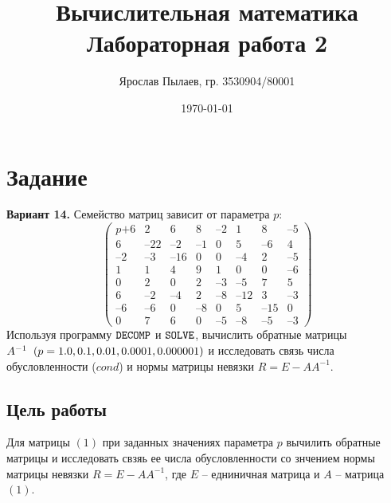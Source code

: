 \documentclass[a4paper,11pt]{article}
\title{Вычислительная математика \\ Лабораторная работа 2}
\author{Ярослав Пылаев, гр. 3530904/80001}
\date{\today}
\begin{document}
\maketitle
\newpage

\section{Задание}
\noindent \textbf{Вариант 14.} Семейство матриц зависит от параметра $p$:
\begin{equation}
  \begin{pmatrix}
    p\text{+}6 & 2 & 6 & 8 & \text{--}2 & 1 & 8 & \text{--}5 \\
    6 & \text{--}22 & \text{--}2 & \text{--}1 & 0 & 5 & \text{--}6 & 4 \\
    \text{--}2 & \text{--}3 & \text{--}16 & 0 & 0 & \text{--}4 & 2 & \text{--}5 \\
    1 & 1 & 4 & 9 & 1 & 0 & 0 & \text{--}6 \\
    0 & 2 & 0 & 2 & \text{--}3 & \text{--}5 & 7 & 5 \\
    6 & \text{--}2 & \text{--}4 & 2 & \text{--}8 & \text{--}12 & 3 & \text{--}3 \\
    \text{--}6 & \text{--}6 & 0 & \text{--}8 & 0 & 5 & \text{--}15 & 0 \\
    0 & 7 & 6 & 0 & \text{--}5 & \text{--}8 & \text{--}5 & \text{--}3
  \end{pmatrix}
\end{equation}
Используя программу $\verb|DECOMP|$ и $\verb|SOLVE|$, вычислить обратные
      матрицы $A^{-1} \hspace{2mm}(p = 1.0, 0.1, 0.01, 0.0001, 0.000001)$ и
      исследовать связь числа обусловленности ($cond$) и нормы матрицы невязки $R = E - AA^{-1}$.

\subsection{Цель работы}
\noindent Для матрицы $(1)$ при заданных значениях параметра $p$ вычилить обратные матрицы
      и исследовать свзяь ее числа обусловленности со знчением нормы матрицы невязки
      $R = E - AA^{-1}$, где $E$ -- едниничная матрица и $A$ -- матрица $(1)$.
\end{document}
